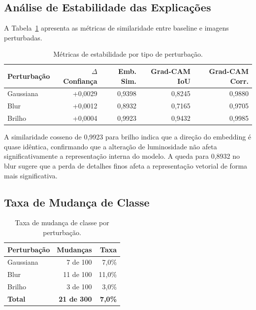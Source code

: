 \documentclass[12pt,a4paper,twoside]{article}
\begin{document}
\subsection{Análise de Estabilidade das Explicações}

A Tabela~\ref{tab:estabilidade} apresenta as métricas de similaridade entre baseline e imagens perturbadas.

\begin{table}[H]
\centering
\caption{Métricas de estabilidade por tipo de perturbação.}
\label{tab:estabilidade}
\begin{tabular}{@{}lrrrr@{}}
\toprule
\textbf{Perturbação} & \textbf{$\Delta$ Confiança} & \textbf{Emb. Sim.} & \textbf{Grad-CAM IoU} & \textbf{Grad-CAM Corr.} \\
\midrule
Gaussiana & +0,0029 & 0,9398 & 0,8245 & 0,9880 \\
Blur & +0,0012 & 0,8932 & 0,7165 & 0,9705 \\
Brilho & +0,0004 & 0,9923 & 0,9432 & 0,9985 \\
\bottomrule
\end{tabular}
\end{table}

A similaridade cosseno de 0,9923 para brilho indica que a direção do embedding é quase idêntica, confirmando que a alteração de luminosidade não afeta significativamente a representação interna do modelo. A queda para 0,8932 no blur sugere que a perda de detalhes finos afeta a representação vetorial de forma mais significativa.

\subsection{Taxa de Mudança de Classe}

\begin{table}[H]
\centering
\caption{Taxa de mudança de classe por perturbação.}
\label{tab:mudancas}
\begin{tabular}{@{}lrr@{}}
\toprule
\textbf{Perturbação} & \textbf{Mudanças} & \textbf{Taxa} \\
\midrule
Gaussiana & 7 de 100 & 7,0\% \\
Blur & 11 de 100 & 11,0\% \\
Brilho & 3 de 100 & 3,0\% \\
\midrule
\textbf{Total} & \textbf{21 de 300} & \textbf{7,0\%} \\
\bottomrule
\end{tabular}
\end{table}
\end{document}
